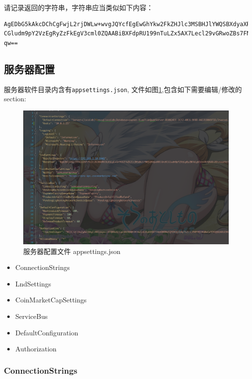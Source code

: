\documentclass[a4paper,11pt]{article}
\theoremstyle{definition}
\begin{document}
请记录返回的字符串，字符串应当类似如下内容：
\begin{verbatim}
AgEDbG5kAkcDChCgFwjL2rjDWLw+wvgJQYcfEgEwGhYkw2FkZHJlc3MSBHJlYWQSBXdyaXRlGhcK
CGludm9pY2VzEgRyZzFkEgV3cml0ZQAABiBXFdpRU199nTuLZx5AX7Lecl29vGRwoZBs7FNc/jcr
qw==
\end{verbatim}


\subsection{服务器配置}\label{sec:server-config}

服务器软件目录内含有\verb|appsettings.json|, 文件如图\ref{fig:appsettings},包含如下需要编辑/修改的section:

    \begin{figure}[htbp]
    \minipage[b][][b]{\textwidth}
        \includegraphics[width=\linewidth]{appsettings.png}
        \caption{服务器配置文件 appsettings.json}
        \label{fig:appsettings}
    \endminipage\hfill
    \end{figure}

\begin{itemize}
  \item ConnectionStrings
  \item LndSettings
  \item CoinMarketCapSettings
  \item ServiceBus
  \item DefaultConfiguration
  \item Authorization
\end{itemize}

\subsubsection{ConnectionStrings}
\end{document}
